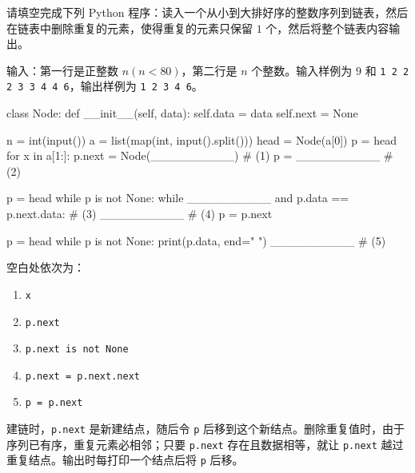 \begin{question}[有序链表删除重复元素]
请填空完成下列 Python 程序：读入一个从小到大排好序的整数序列到链表，然后在链表中删除重复的元素，使得重复的元素只保留 $1$ 个，然后将整个链表内容输出。

输入：第一行是正整数 $n(n<80)$，第二行是 $n$ 个整数。输入样例为 $9$ 和 \texttt{1 2 2 2 3 3 4 4 6}，输出样例为 \texttt{1 2 3 4 6}。
\begin{pycode}
class Node:
    def __init__(self, data):
        self.data = data
        self.next = None

n = int(input())
a = list(map(int, input().split()))
head = Node(a[0])
p = head
for x in a[1:]:
    p.next = Node(__________)                  # (1)
    p = __________                             # (2)

p = head
while p is not None:
    while __________ and p.data == p.next.data: # (3)
        __________                              # (4)
    p = p.next

p = head
while p is not None:
    print(p.data, end=" ")
    __________                                  # (5)
\end{pycode}
\begin{solution}
空白处依次为：
\begin{enumerate}
  \item \texttt{x}
  \item \texttt{p.next}
  \item \texttt{p.next is not None}
  \item \texttt{p.next = p.next.next}
  \item \texttt{p = p.next}
\end{enumerate}
建链时，\texttt{p.next} 是新建结点，随后令 \texttt{p} 后移到这个新结点。删除重复值时，由于序列已有序，重复元素必相邻；只要 \texttt{p.next} 存在且数据相等，就让 \texttt{p.next} 越过重复结点。输出时每打印一个结点后将 \texttt{p} 后移。
\end{solution}
\end{question}


